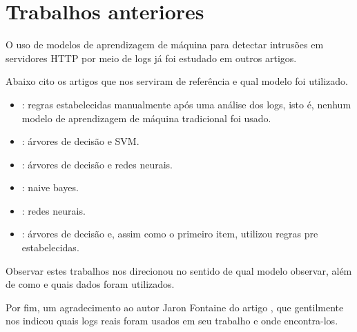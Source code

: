 
\chapter{Trabalhos anteriores}
\label{cap:fundamentation}

O uso de modelos de aprendizagem de máquina para detectar intrusões em servidores HTTP 
por meio de logs já foi estudado em outros artigos. 

Abaixo cito os artigos que nos serviram de referência e qual modelo foi utilizado.

\begin{itemize}
    \item \cite{ref:art3}: regras estabelecidas manualmente após uma análise dos logs,
    isto é, nenhum modelo de aprendizagem de máquina tradicional foi usado.
    \item \cite{ref:art4}: árvores de decisão e SVM.
    \item \cite{ref:art6}: árvores de decisão e redes neurais.
    \item \cite{ref:art2}: naive bayes.
    \item \cite{ref:art7}: redes neurais.
    \item \cite{ref:art1}: árvores de decisão e, assim como o primeiro item, utilizou 
    regras pre estabelecidas.
\end{itemize}

Observar estes trabalhos nos direcionou no sentido de qual modelo observar, além de como 
e quais dados foram utilizados.

Por fim, um agradecimento ao autor Jaron Fontaine do artigo \cite{ref:art6}, que gentilmente
nos indicou quais logs reais foram usados em seu trabalho e onde encontra-los.